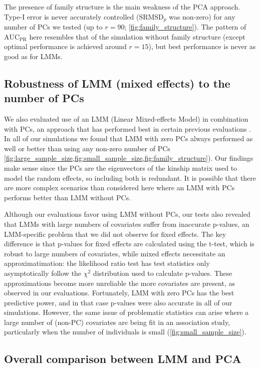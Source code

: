 \documentclass[11pt]{article}
\newcommand{\rmsd}{\text{SRMSD}_p}
\newcommand{\auc}{\text{AUC}_\text{PR}}
\begin{document}
The presence of family structure is the main weakness of the PCA approach.
Type-I error is never accurately controlled ($\rmsd$ was non-zero) for any number of PCs we tested (up to $r=90$; \cref{fig:family_structure}).
The pattern of $\auc$ here resembles that of the simulation without family structure (except optimal performance is achieved around $r = 15$), but best performance is never as good as for LMMs.

\subsection{Robustness of LMM (mixed effects) to the number of PCs}

We also evaluated use of an LMM (Linear Mixed-effects Model) in combination with PCs, an approach that has performed best in certain previous evaluations \citep{zhao_arabidopsis_2007, price_new_2010}.
In all of our simulations we found that LMM with zero PCs always performed as well or better than using any non-zero number of PCs \cref{fig:large_sample_size,fig:small_sample_size,fig:family_structure}).
Our findings make sense since the PCs are the eigenvectors of the kinship matrix used to model the random effects, so including both is redundant.
It is possible that there are more complex scenarios than considered here where an LMM with PCs performs better than LMM without PCs.

Although our evaluations favor using LMM without PCs, our tests also revealed that LMMs with large numbers of covariates suffer from inaccurate p-values, an LMM-specific problem that we did not observe for fixed effects.
The key difference is that p-values for fixed effects are calculated using the t-test, which is robust to large numbers of covariates, while mixed effects necessitate an approximatimation: the likelihood ratio test has test statistics only asymptotically follow the $\chi^2$ distribution used to calculate p-values.
These approximations become more unreliable the more covariates are present, as observed in our evaluations.
Fortunately, LMM with zero PCs has the best predictive power, and in that case p-values were also accurate in all of our simulations.
However, the same issue of problematic statistics can arise where a large number of (non-PC) covariates are being fit in an association study, particularly when the number of individuals is small (\cref{fig:small_sample_size}).

\subsection{Overall comparison between LMM and PCA}
\end{document}
